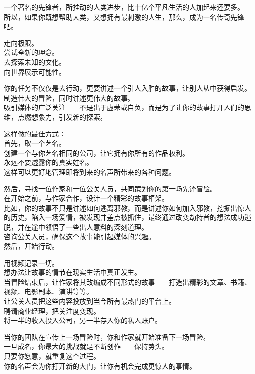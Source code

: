 \documentclass[
]{article}
\begin{document}
一个著名的先锋者，所推动的人类进步，比十亿个平凡生活的人加起来还要多。\\
所以，如果你既想帮助人类，又想拥有最刺激的人生，那么，成为一名传奇先锋吧。

走向极限。\\
尝试全新的理念。\\
去探索未知的文化。\\
向世界展示可能性。

你的任务不仅仅是去行动，更要讲述一个引人入胜的故事，让别人从中获得启发。\\
制造伟大的冒险，同时讲述更伟大的故事。\\
吸引媒体的广泛关注------不是出于虚荣或自负，而是为了让你的故事打开人们的思维，点燃想象力，引发新的探索。

这样做的最佳方式：\\
首先，取一个艺名。\\
创建一个与你艺名相同的公司，让它拥有你所有的作品权利。\\
永远不要透露你的真实姓名。\\
这样可以更好地管理即将到来的名声所带来的各种问题。

然后，寻找一位作家和一位公关人员，共同策划你的第一场先锋冒险。\\
在开始之前，与作家合作，设计一个精彩的故事框架。\\
比如，你的故事不只是讲述如何逃离邪教，而是讲述你如何加入邪教，挖掘出惊人的历史，陷入一场爱情，被发现并差点被抓住，最终通过改变劫持者的想法成功逃脱，并在途中领悟了一些出人意料的深刻道理。\\
咨询公关人员，确保这个故事能引起媒体的兴趣。\\
然后，开始行动。

用视频记录一切。\\
想办法让故事的情节在现实生活中真正发生。\\
当冒险结束后，让作家将其改编成不同形式的故事------打造出精彩的文章、书籍、视频、电影剧本、演讲等等。\\
让公关人员把这些内容投放到当今所有最热门的平台上。\\
聘请商业经理，把关注度变现。\\
将一半的收入投入公司，另一半存入你的私人账户。

当你的团队在宣传上一场冒险时，你和作家就开始准备下一场冒险。\\
一旦成名，你最大的挑战就是不断创作------保持势头。\\
只要你愿意，就重复这个过程。\\
你的名声会为你打开新的大门，让你有机会完成更惊人的事情。
\end{document}
